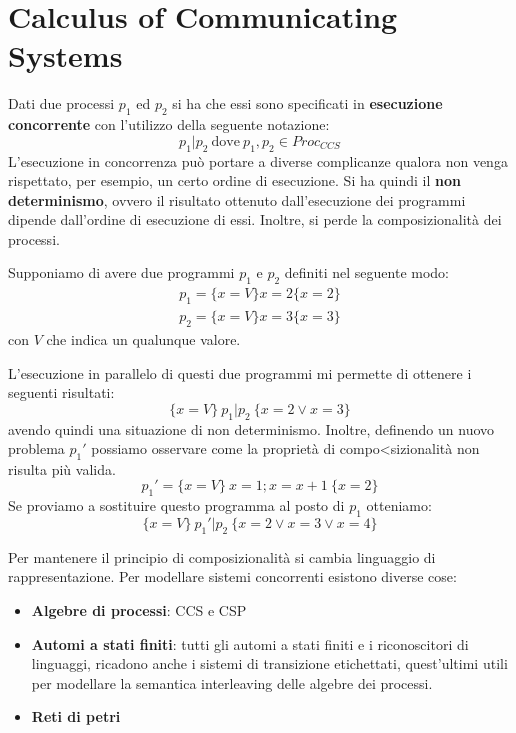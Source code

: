\chapter{Calculus of Communicating Systems}
Dati due processi $p_1$ ed $p_2$ si ha che essi sono specificati in
\textbf{esecuzione concorrente} con l'utilizzo della seguente notazione:
\begin{equation}
    p_1 | p_2 \ \text{dove} \ p_1, p_2 \in Proc_{CCS}
\end{equation}
L'esecuzione in concorrenza può portare a diverse complicanze qualora non venga
rispettato, per esempio, un certo ordine di esecuzione. Si ha quindi il
\textbf{non determinismo}, ovvero il risultato ottenuto dall'esecuzione dei
programmi dipende dall'ordine di esecuzione di essi. Inoltre, si perde la
composizionalità dei processi.
\begin{esempio}
    Supponiamo di avere due programmi $p_1$ e $p_2$ definiti nel seguente
    modo:
    \begin{equation}
        \begin{aligned}
            p_1 =\{x = V\} x = 2 \{x = 2\} \\
            p_2 =\{x = V\} x = 3 \{x = 3\}
        \end{aligned}
    \end{equation}
    con $V$ che indica un qualunque valore.

    L'esecuzione in parallelo di questi due programmi mi permette di ottenere i
    seguenti risultati:
    \begin{equation}
        \{x = V\} \ p_1 | p_2 \ \{x = 2 \lor x = 3\}
    \end{equation}
    avendo quindi una situazione di non determinismo. Inoltre, definendo un nuovo
    problema $p_1'$ possiamo osservare come la proprietà di compo<sizionalità non
    risulta più valida.
    \begin{equation}
        p_1' = \{x = V\} \ x = 1; x = x + 1 \ \{x = 2\}
    \end{equation}
    Se proviamo a sostituire questo programma al posto di $p_1$ otteniamo:
    \begin{equation}
        \{x = V\} \ p_1' | p_2 \ \{x = 2 \lor x = 3 \lor x = 4\}
    \end{equation}
\end{esempio}
Per mantenere il principio di composizionalità si cambia linguaggio di rappresentazione.
Per modellare sistemi concorrenti esistono diverse cose:
\begin{itemize}
    \item \textbf{Algebre di processi}: CCS e CSP
    \item \textbf{Automi a stati finiti}: tutti gli automi a stati finiti e i
          riconoscitori di linguaggi, ricadono anche i sistemi di transizione
          etichettati, quest'ultimi utili per modellare la semantica interleaving
          delle algebre dei processi.
    \item \textbf{Reti di petri}
\end{itemize}
